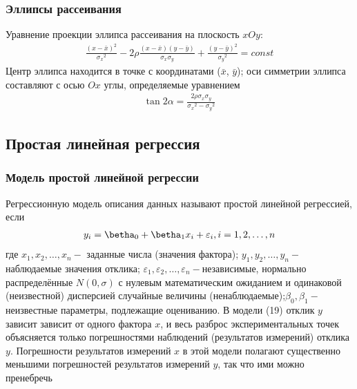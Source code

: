         \subsubsection{Эллипсы рассеивания}
        Уравнение проекции эллипса рассеивания на плоскость $xOy$:
        \begin{gather}
            \frac{(x-\bar{x})^2}{{\sigma_x}^2} - 2\rho\frac{(x-\bar{x})(y-\bar{y})}{\sigma_x\sigma_y} + \frac{(y-\bar{y})^2}{{\sigma_y}^2} = const
        \end{gather}
        Центр эллипса находится в точке с координатами ($\bar{x}$, $\bar{y}$); оси симметрии эллипса составляют с осью $Ox$ углы, определяемые уравнением
        \begin{gather}
            \tan{2\alpha} = \frac{2\rho\sigma_x\sigma_y}{{\sigma_x}^2 - {\sigma_y}^2}
        \end{gather}
    \subsection{Простая линейная регрессия}
        \subsubsection{Модель простой линейной регрессии}
        Регрессионную модель описания данных называют простой линейной регрессией, если
        \begin{gather*}
            y_i = \betha_0 + \betha_{1}x_i + \varepsilon_i, i = 1,2,\dots,n \\
        \end{gather*}
        где $x_1, x_2, \dots, x_n -$ заданные числа (значения фактора); $y_1, y_2, \dots, y_n -$ наблюдаемые значения отклика; $\varepsilon_1, \varepsilon_2, \dots, \varepsilon_n -$независимые, нормально распределённые $N(0, \sigma)$ с нулевым математическим ожиданием и одинаковой (неизвестной) дисперсией случайные величины (ненаблюдаемые);$\beta_0, \beta_1 -$неизвестные параметры, подлежащие оцениванию.
        В модели (19) отклик $y$ зависит зависит от одного фактора $x$, и весь разброс экспериментальных точек объясняется только погрешностями наблюдений (результатов измерений) отклика $y$. Погрешности результатов измерений $x$ в этой модели полагают существенно меньшими погрешностей результатов измерений $y$, так что ими можно пренебречь
